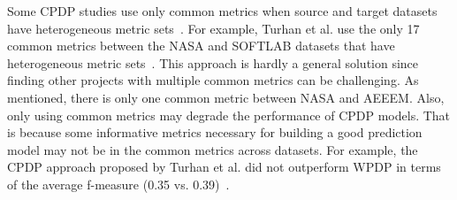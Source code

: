 Some CPDP studies use only common metrics when source and target datasets have
heterogeneous metric sets~\cite{Ma12,Turhan09}.
For example, Turhan et al. use the only 17 common metrics between the NASA and
SOFTLAB datasets that have heterogeneous metric sets~\cite{Turhan09}.
This approach is hardly a general solution since
finding other projects with multiple common metrics can be challenging. As
mentioned, there is only one common metric between NASA and AEEEM. Also,
only using common metrics may degrade the performance of CPDP models.
That is because some informative metrics necessary for building a good prediction model may not
be in the common metrics across datasets. For example, the CPDP approach proposed by Turhan et al. did not
outperform WPDP in terms of the average
f-measure (0.35 vs. 0.39)~\cite{Turhan09}.

%
%


